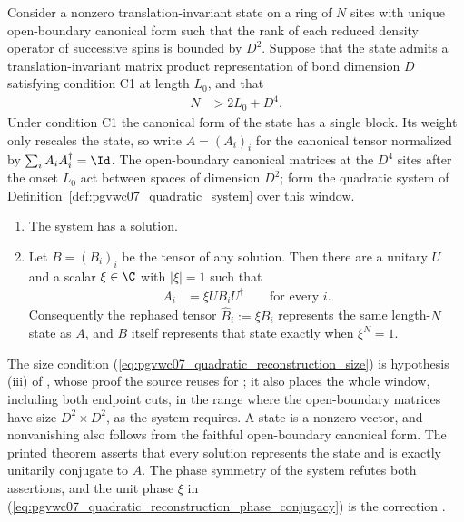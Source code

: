 \begin{lemma}
    \label{thm:pgvwc07_quadratic_reconstruction}
    \leanok
    Consider a nonzero translation-invariant state on a ring of $N$ sites
    with unique open-boundary canonical form such that the rank of each
    reduced density operator of successive spins is bounded by $D^2$.
    Suppose that the state admits a translation-invariant matrix product
    representation of bond dimension $D$ satisfying condition C1 at length
    $L_0$, and that
    \begin{align}
        N & >2L_0+D^4.
        \label{eq:pgvwc07_quadratic_reconstruction_size}
    \end{align}
    Under condition C1 the canonical form of the state has a single block.
    Its weight only rescales the state, so write $A=(A_i)_i$ for the
    canonical tensor normalized by $\sum_iA_iA_i^{\dagger}=\Id$. The
    open-boundary canonical matrices at the $D^4$ sites after the onset
    $L_0$ act between spaces of dimension $D^2$; form the quadratic system
    of Definition~\ref{def:pgvwc07_quadratic_system} over this window.
    \begin{enumerate}
        \item The system has a solution.
        \item Let $B=(B_i)_i$ be the tensor of any solution. Then there are
              a unitary $U$ and a scalar $\xi\in\C$ with $|\xi|=1$ such that
              \begin{align}
                  A_i & =\xi UB_iU^{\dagger}
                  \qquad\text{for every }i.
                  \label{eq:pgvwc07_quadratic_reconstruction_phase_conjugacy}
              \end{align}
              Consequently the rephased tensor $\widehat B_i:=\xi B_i$
              represents the same length-$N$ state as $A$, and $B$ itself
              represents that state exactly when $\xi^N=1$.
    \end{enumerate}
    The size condition (\ref{eq:pgvwc07_quadratic_reconstruction_size}) is
    hypothesis (iii) of \cite[Theorem~7]{PerezGarcia2007Matrix}, whose proof
    the source reuses for \cite[Theorem~8]{PerezGarcia2007Matrix}; it also
    places the whole window, including both endpoint cuts, in the range where
    the open-boundary matrices have size $D^2\times D^2$, as the system
    requires. A state is a nonzero vector, and nonvanishing also follows from
    the faithful open-boundary canonical form. The printed theorem asserts
    that every solution represents the state and is exactly unitarily
    conjugate to $A$. The phase symmetry of the system refutes both
    assertions, and the unit phase $\xi$ in
    (\ref{eq:pgvwc07_quadratic_reconstruction_phase_conjugacy}) is the
    correction \cite{gap:pgvwc07_quadratic_reconstruction_phase}.
\end{lemma}

